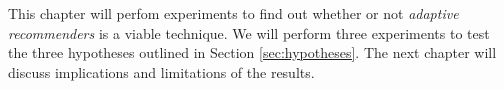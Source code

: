 \label{chap:results}

This chapter will perfom experiments to find out whether or not
\emph{adaptive recommenders} is a viable technique.
We will perform three experiments to 
test the three hypotheses outlined in Section 
\ref{sec:hypotheses}.
The next chapter will discuss implications 
and limitations of the results.







%

